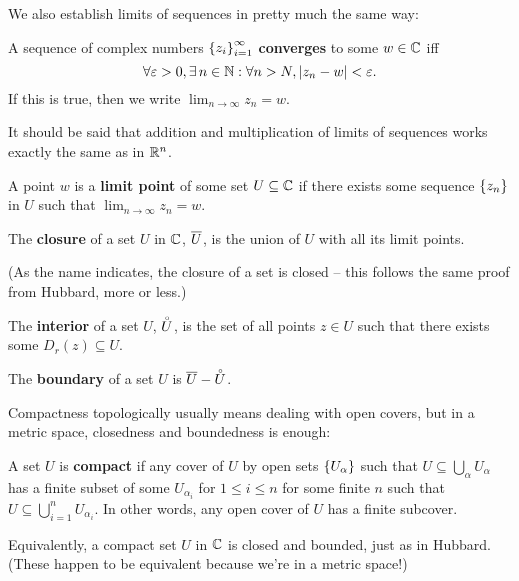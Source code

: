 We also establish limits of sequences in pretty much the same way:
\begin{definition}
  A sequence of complex numbers $\left\{ z_i \right\}_{i=1}^\infty$ \textbf{converges} to some $w \in \mathbb C$ iff \[ \forall \varepsilon > 0, \exists \, n \in \mathbb N : \forall n > N, |z_n - w| < \varepsilon. \] If this is true, then we write $\lim_{n \to \infty} z_n = w$.
\end{definition}
It should be said that addition and multiplication of limits of sequences works exactly the same as in $\mathbb R^n$.

\begin{definition}
  A point $w$ is a \textbf{limit point} of some set $U \subseteq \mathbb C$ if there exists some sequence $\left\{ z_n \right\}$ in $U$ such that $\lim_{n \to \infty} z_n = w$.
\end{definition}

\begin{definition}
  The \textbf{closure} of a set $U$ in $\mathbb C$, $\overline{U}$, is the union of $U$ with all its limit points.

  (As the name indicates, the closure of a set is closed -- this follows the same proof from Hubbard, more or less.)
\end{definition}

\begin{definition}
  The \textbf{interior} of a set $U$, $\accentset{\circ}{U}$, is the set of all points $z \in U$ such that there exists some $D_r(z) \subseteq U$.
\end{definition}

\begin{definition}
  The \textbf{boundary} of a set $U$ is $\overline{U} - \accentset{\circ}{U}$.
\end{definition}

Compactness topologically usually means dealing with open covers, but in a metric space, closedness and boundedness is enough:
\begin{definition}
  A set $U$ is \textbf{compact} if any cover of $U$ by open sets $\left\{ U_\alpha \right\}$ such that $U \subseteq \bigcup_\alpha U_\alpha$ has a finite subset of some $U_{\alpha_i}$ for $1 \leq i \leq n$ for some finite $n$ such that $U \subseteq \bigcup_{i=1}^n U_{\alpha_i}$. In other words, any open cover of $U$ has a finite subcover.

  Equivalently, a compact set $U$ in $\mathbb C$ is closed and bounded, just as in Hubbard. (These happen to be equivalent because we're in a metric space!)
\end{definition}

